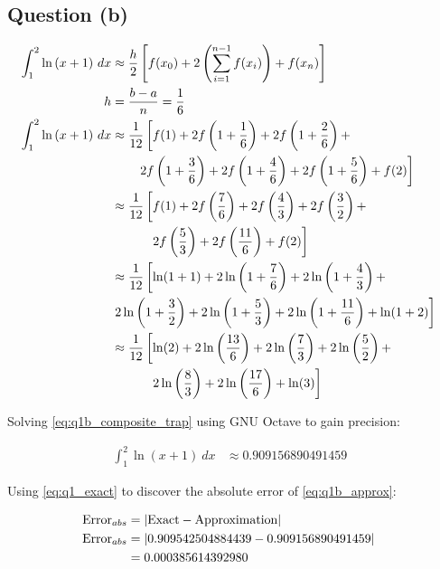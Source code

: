 	\subsection{Question (b)}
		\begin{align}
			\int_{1}^{2}\ln{(x+1)} \ dx	 &\approx \frac{h}{2}\left[f(x_{0})+2\left(\sum_{i=1}^{n-1}f(x_i)\right)+f(x_{n})\right]& \\
			h &= \frac{b-a}{n} = \frac{1}{6}& \\
			\int_{1}^{2}\ln{(x+1)} \ dx	 &\approx  \frac{1}{12}\left[
				f(1)+
				2f\left(1+\frac{1}{6}\right)+
				2f\left(1+\frac{2}{6}\right)+
				\right.& \notag \\ &\left. \quad \quad
				2f\left(1+\frac{3}{6}\right)+
				2f\left(1+\frac{4}{6}\right)+
				2f\left(1+\frac{5}{6}\right)+
				f(2)
			\right]& \notag \\
			&\approx \frac{1}{12}\left[
				f(1)+
				2f\left(\frac{7}{6}\right)+
				2f\left(\frac{4}{3}\right)+
				2f\left(\frac{3}{2}\right)+
				\right.& \notag \\ &\left. \quad \quad \quad
				2f\left(\frac{5}{3}\right)+
				2f\left(\frac{11}{6}\right)+
				f(2)
			\right]& \\
			&\approx \frac{1}{12}\left[
				\ln(1+1)+
				2\ln\left(1+\frac{7}{6}\right)+
				2\ln\left(1+\frac{4}{3}\right)+
				\right.& \notag \\ &\left.
				2\ln\left(1+\frac{3}{2}\right)+
				2\ln\left(1+\frac{5}{3}\right)+
				2\ln\left(1+\frac{11}{6}\right)+
				\ln(1+2)
			\right]& \notag \\
			&\approx \frac{1}{12}\left[
				\ln(2)+
				2\ln\left(\frac{13}{6}\right)+
				2\ln\left(\frac{7}{3}\right)+
				2\ln\left(\frac{5}{2}\right)+
				\right.& \notag \\ &\left. \quad \quad \quad
				2\ln\left(\frac{8}{3}\right)+
				2\ln\left(\frac{17}{6}\right)+
				\ln(3)
			\right]& \label{eq:q1b_composite_trap}
		\end{align}

		Solving \cref{eq:q1b_composite_trap} using GNU Octave to gain precision:

		\begin{align}
			\int_{1}^{2}\ln{(x+1)} \ dx &\approx 0.909156890491459& \label{eq:q1b_approx}
		\end{align}

		Using \cref{eq:q1_exact} to discover the absolute error of \cref{eq:q1b_approx}:

		\begin{align}
			\text{Error}_{abs} &= |\text{Exact} - \text{Approximation}|& \\
			\text{Error}_{abs} &= |0.909542504884439 - 0.909156890491459|& \notag \\
			&= 0.000385614392980&
		\end{align}

